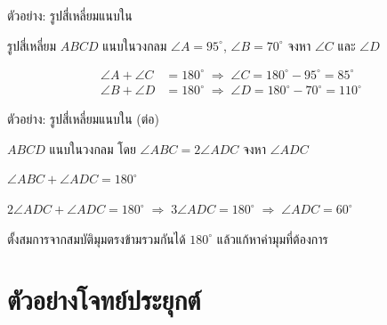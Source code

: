 \documentclass[11pt, aspectratio=169]{beamer}
\begin{document}
\begin{frame}{ตัวอย่าง: รูปสี่เหลี่ยมแนบใน}
  \begin{exambox}[โจทย์]
    รูปสี่เหลี่ยม $ABCD$ แนบในวงกลม $\angle A = 95^\circ$, $\angle B = 70^\circ$ จงหา $\angle C$ และ $\angle D$
  \end{exambox}

  \begin{solbox}[วิธีทำ]
    \begin{align*}
      \angle A + \angle C &= 180^\circ \;\Rightarrow\; \angle C = 180^\circ - 95^\circ = 85^\circ \\[4pt]
      \angle B + \angle D &= 180^\circ \;\Rightarrow\; \angle D = 180^\circ - 70^\circ = 110^\circ
    \end{align*}
  \end{solbox}
\end{frame}

\begin{frame}{ตัวอย่าง: รูปสี่เหลี่ยมแนบใน (ต่อ)}
  \begin{exambox}[โจทย์]
    $ABCD$ แนบในวงกลม โดย $\angle ABC = 2\angle ADC$ จงหา $\angle ADC$
  \end{exambox}

  \begin{solbox}[วิธีทำ]
    $\angle ABC + \angle ADC = 180^\circ$

    $2\angle ADC + \angle ADC = 180^\circ \;\Rightarrow\; 3\angle ADC = 180^\circ \;\Rightarrow\; \angle ADC = 60^\circ$
  \end{solbox}

  \begin{intuition}[เทคนิค]
    ตั้งสมการจากสมบัติมุมตรงข้ามรวมกันได้ $180^\circ$ แล้วแก้หาค่ามุมที่ต้องการ
  \end{intuition}
\end{frame}

\section{ตัวอย่างโจทย์ประยุกต์}
\end{document}
